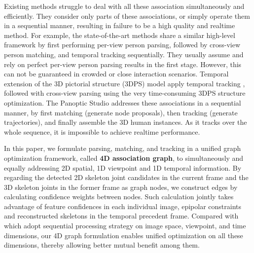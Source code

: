 \documentclass[10pt,twocolumn,letterpaper]{article}
\begin{document}
Existing methods struggle to deal with all these association simultaneously and efficiently. They consider only parts of these associations, or simply operate them in a sequential manner, resulting in failure to be a high quality and realtime method. For example, the state-of-the-art methods \cite{dong2019fast,bridgeman2019multi,tanke2019iterative} share a similar high-level framework by first performing per-view person parsing, followed by cross-view person matching, and temporal tracking sequentially. They usually assume and rely on perfect per-view person parsing results in the first stage. However, this can not be guaranteed in crowded or close interaction scenarios. Temporal extension \cite{belagiannis2014temporal3DPS,belagiannis20163dps} of the 3D pictorial structure (3DPS) model \cite{belagiannis20143d} apply temporal tracking \cite{multi-object-tracking}, followed with cross-view parsing using the very time-consuming 3DPS structure optimization. The Panoptic Studio \cite{joo2019panoptic} addresses these associations in a sequential manner, by first matching (generate node proposals), then tracking (generate trajectories), and finally assemble the 3D human instances. As it tracks over the whole sequence, it is impossible to achieve realtime performance. 



In this paper, we formulate parsing, matching, and tracking in a unified graph optimization framework, called {\bf 4D association graph}, to simultaneously and equally addressing 2D spatial, 1D viewpoint and 1D temporal information. By regarding the detected 2D skeleton joint candidates in the current frame and the 3D skeleton joints in the former frame as graph nodes, we construct edges by calculating confidence weights between nodes. Such calculation jointly takes advantage of feature confidences in each individual image, epipolar constraints and reconstructed skeletons in the temporal precedent frame. Compared with \cite{dong2019fast,joo2019panoptic,belagiannis2014temporal3DPS,belagiannis20163dps} which adopt sequential processing strategy on image space, viewpoint, and time dimensions, our 4D graph formulation enables unified optimization on all these dimensions, thereby allowing better mutual benefit among them. 
\end{document}
